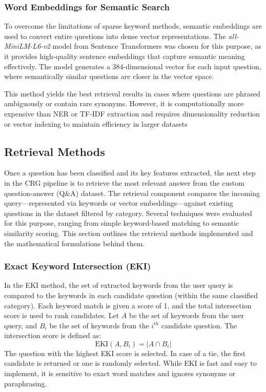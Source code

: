 \documentclass[conference]{IEEEtran}
\begin{document}
\subsubsection{Word Embeddings for Semantic Search} \label{sec:word_embeddings}
To overcome the limitations of sparse keyword methods, semantic embeddings are used to convert entire questions into dense vector representations.
The \textit{all-MiniLM-L6-v2} model from Sentence Transformers \cite{b15} \cite{b16} was chosen for this purpose, as it provides high-quality sentence embeddings that capture semantic meaning effectively.
The model generates a 384-dimensional vector for each input question, where semantically similar questions are closer in the vector space.

This method yields the best retrieval results in cases where questions are phrased ambiguously or contain rare synonyms. 
However, it is computationally more expensive than NER or TF-IDF extraction and requires dimensionality reduction or vector indexing to maintain efficiency in larger datasets

\subsection{Retrieval Methods}
Once a question has been classified and its key features extracted, the next step in the CRG pipeline is to retrieve the most relevant answer from the custom question-answer (Q\&A) dataset. 
The retrieval component compares the incoming query—represented via keywords or vector embeddings—against existing questions in the dataset filtered by category. 
Several techniques were evaluated for this purpose, ranging from simple keyword-based matching to semantic similarity scoring. 
This section outlines the retrieval methods implemented and the mathematical formulations behind them.

\subsubsection{Exact Keyword Intersection (EKI)}
In the EKI method, the set of extracted keywords from the user query is compared to the keywords in each candidate question (within the same classified category). 
Each keyword match is given a score of 1, and the total intersection score is used to rank candidates.
Let $A$ be the set of keywords from the user query, and $B_i$ be the set of keywords from the $i^{th}$ candidate question.
The intersection score is defined as:
\begin{equation}
    \text{EKI}(A, B_i) = |A \cap B_i| 
\end{equation}
The question with the highest EKI score is selected. 
In case of a tie, the first candidate is returned or one is randomly selected. 
While EKI is fast and easy to implement, it is sensitive to exact word matches and ignores synonyms or paraphrasing.
\end{document}
